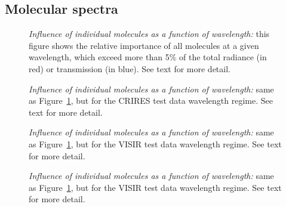 \begin{appendix}
\section{Molecular spectra}
\begin{figure}[ht]
  \begin{center}
    \caption{{\it Influence of individual molecules as a function of
    wavelength:} this figure shows the relative importance of all molecules at
    a given wavelength, which exceed more than 5\% of the total radiance (in
    red) or transmission (in blue). See text for more detail.}
    \label{fig:molecs_all}
  \end{center}
\end{figure}
\begin{figure}[ht]
  \begin{center}
    \caption{{\it Influence of individual molecules as a function of
    wavelength:} same as Figure~\ref{fig:molecs_all}, but for the CRIRES test
    data wavelength regime. See text for more detail.}
    \label{fig:molecs_crires}
  \end{center}
\end{figure}
\begin{figure}[ht]
  \begin{center}
    \caption{{\it Influence of individual molecules as a function of
    wavelength:} same as Figure~\ref{fig:molecs_all}, but for the VISIR test
    data wavelength regime. See text for more detail.}
    \label{fig:molecs_visir3}
  \end{center}
\end{figure}
\begin{figure}[ht]
    \begin{center}
    \caption{{\it Influence of individual molecules as a function of
    wavelength:} same as Figure~\ref{fig:molecs_all}, but for the VISIR test
    data wavelength regime. See text for more detail.}

\end{center}
\end{figure}
\end{appendix}
